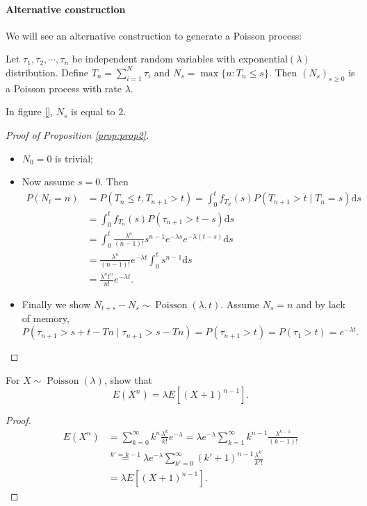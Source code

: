 \documentclass[11pt,singlecolumn, openany, citestyle=authoryear]{elegantbook}
\begin{document}
\begin{CJK}{UTF8}{gbsn}
\paragraph*{Alternative construction} We will see an alternative construction to generate a 
Poisson process:
\begin{proposition}\label{prop:prop2}
    Let $\tau_1,\tau_2,\cdots,\tau_n$ be independent random variables with exponential$(\lambda)$
    distribution. Define $T_n=\displaystyle \sum_{i=1}^N \tau_i$ and 
    $N_s=\max\{n:T_n\leqslant s\}$. Then $(N_s)_{s\geqslant 0}$ is a Poisson process with rate 
    $\lambda$.
\end{proposition}
\begin{example}
    In figure \ref{}, $N_s$ is equal to $2$.
\end{example}
\begin{proof}[Proof of Proposition \ref{prop:prop2}]
    \begin{itemize}
        \item $N_0=0$ is trivial;
        \item Now assume $s=0$. Then 
        \begin{align*}
            P(N_t=n)&=P(T_n\leqslant t,T_{n+1}>t)=\int_{0}^t f_{T_n}(s)P(T_{n+1}>t\mid 
            T_n=s)\mathrm{d}s\\
            &=\int_0^t f_{T_n}(s)P(\tau_{n+1}>t-s)\mathrm{d}s\\
            &=\int_0^t \frac{\lambda^n}{(n-1)!}s^{n-1}e^{-\lambda s}
            e^{-\lambda(t-s)}\mathrm{d}s \\
            &=\frac{\lambda^n}{(n-1)!} e^{-\lambda t} \int_0^t s^{n-1}\mathrm{d}s\\
            &=\frac{\lambda^n t^n}{n!}e^{-\lambda t}.
        \end{align*}
        \item Finally we show $N_{t+s}-N_s \sim \operatorname{Poisson}(\lambda,t)$.
        Assume $N_s = n$ and by lack of memory,
        $$
        P(\tau_{n+1}>s+t-Tn \mid \tau_{n+1}>s-Tn)=P(\tau_{n+1}>t)=P(\tau_1>t)=e^{-\lambda t}.
        $$

    \end{itemize}
\end{proof}

\begin{exercise}
    For $X\sim \operatorname{Poisson}(\lambda)$, show that 
    $$
    E(X^n)=\lambda E[(X+1)^{n-1}].
    $$
\end{exercise}
\begin{proof}
    \begin{align*}
        E(X^n)&=\sum_{k=0}^\infty k^n\frac{\lambda^k}{k!}e^{-\lambda}
        =\lambda e^{-\lambda} \sum_{k=1}^\infty k^{n-1}\frac{\lambda^{k-1}}{(k-1)!}\\
        &\overset{k'=k-1}{=}\lambda e^{-\lambda} 
        \sum_{k'=0}^\infty (k'+1)^{n-1}\frac{\lambda^{k'}}{k'!}\\
        &=\lambda E[(X+1)^{n-1}].
    \end{align*}
\end{proof}


\end{CJK}
\end{document}
